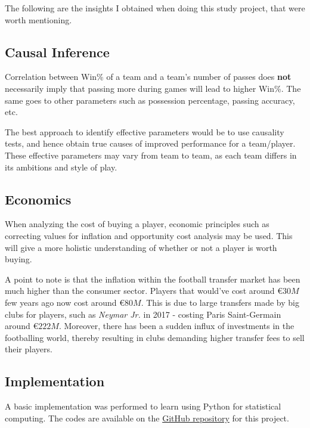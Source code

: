 \documentclass[
  english,
  doc,floatsintext]{apa6}
\begin{document}
The following are the insights I obtained when doing this study project, that were worth mentioning.

\hypertarget{causal-inference}{%
\subsection{Causal Inference}\label{causal-inference}}

Correlation between Win\% of a team and a team's number of passes does \textbf{not} necessarily imply that passing more during games will lead to higher Win\%. The same goes to other parameters such as possession percentage, passing accuracy, etc.

The best approach to identify effective parameters would be to use causality tests, and hence obtain true causes of improved performance for a team/player. These effective parameters may vary from team to team, as each team differs in its ambitions and style of play.

\hypertarget{economics}{%
\subsection{Economics}\label{economics}}

When analyzing the cost of buying a player, economic principles such as correcting values for inflation and opportunity cost analysis may be used. This will give a more holistic understanding of whether or not a player is worth buying.

A point to note is that the inflation within the football transfer market has been much higher than the consumer sector. Players that would've cost around \(€ 30M\) few years ago now cost around \(€ 80M\). This is due to large transfers made by big clubs for players, such as \emph{Neymar Jr.} in 2017 - costing Paris Saint-Germain around \(€ 222M\). Moreover, there has been a sudden influx of investments in the footballing world, thereby resulting in clubs demanding higher transfer fees to sell their players.

\hypertarget{implementation-1}{%
\subsection{Implementation}\label{implementation-1}}

A basic implementation was performed to learn using Python for statistical computing. The codes are available on the \href{https://github.com/AhmedThahir/StudyProject\#implementations}{GitHub repository} for this project.
\end{document}
